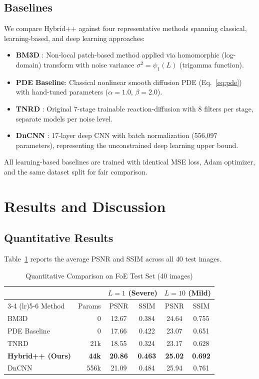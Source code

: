 \documentclass[conference]{IEEEtran}
\begin{document}
\subsection{Baselines}
We compare Hybrid++ against four representative methods spanning classical, learning-based, and deep learning approaches:
\begin{itemize}
\item \textbf{BM3D} \cite{dabov2007bm3d}: Non-local patch-based method applied via homomorphic (log-domain) transform with noise variance $\sigma^2 = \psi_1(L)$ (trigamma function).
\item \textbf{PDE Baseline}: Classical nonlinear smooth diffusion PDE (Eq.~\ref{eq:pde}) with hand-tuned parameters ($\alpha{=}1.0$, $\beta{=}2.0$).
\item \textbf{TNRD} \cite{chen2017tnrd}: Original 7-stage trainable reaction-diffusion with 8 filters per stage, separate models per noise level.
\item \textbf{DnCNN} \cite{zhang2017beyond}: 17-layer deep CNN with batch normalization (556,097 parameters), representing the unconstrained deep learning upper bound.
\end{itemize}

All learning-based baselines are trained with identical MSE loss, Adam optimizer, and the same dataset split for fair comparison.

\section{Results and Discussion}

\subsection{Quantitative Results}
Table~\ref{tab:main_results} reports the average PSNR and SSIM across all 40 test images.

\begin{table}[t]
\caption{Quantitative Comparison on FoE Test Set (40 images)}
\label{tab:main_results}
\centering
\begin{tabular}{l r cc cc}
\toprule
& & \multicolumn{2}{c}{$L=1$ (Severe)} & \multicolumn{2}{c}{$L=10$ (Mild)} \\
\cmidrule(lr){3-4} \cmidrule(lr){5-6}
Method & Params & PSNR & SSIM & PSNR & SSIM \\
\midrule
BM3D \cite{dabov2007bm3d} & 0 & 12.67 & 0.384 & 24.64 & 0.755 \\
PDE Baseline & 0 & 17.66 & 0.422 & 23.07 & 0.651 \\
TNRD \cite{chen2017tnrd} & 21k & 18.55 & 0.324 & 23.17 & 0.628 \\
\textbf{Hybrid++ (Ours)} & \textbf{44k} & \textbf{20.86} & \textbf{0.463} & \textbf{25.02} & \textbf{0.692} \\
\midrule
DnCNN \cite{zhang2017beyond} & 556k & 21.09 & 0.484 & 25.94 & 0.761 \\
\bottomrule
\end{tabular}
\end{table}
\end{document}
